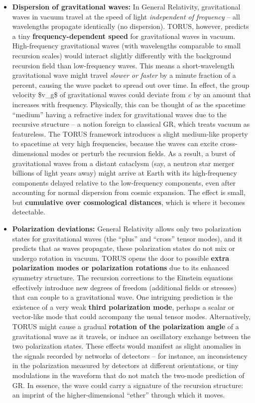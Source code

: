 \documentclass[]{article}
\begin{document}
\begin{itemize}
\item
  \textbf{Dispersion of gravitational waves:} In General Relativity,
  gravitational waves in vacuum travel at the speed of light
  \emph{independent of frequency} -- all wavelengths propagate
  identically (no dispersion). TORUS, however, predicts a tiny
  \textbf{frequency-dependent speed} for gravitational waves in vacuum​.
  High-frequency gravitational waves (with wavelengths comparable to
  small recursion scales) would interact slightly differently with the
  background recursion field than low-frequency waves. This means a
  short-wavelength gravitational wave might travel \emph{slower or
  faster} by a minute fraction of a percent, causing the wave packet to
  spread out over time. In effect, the group velocity \$v\_g\$ of
  gravitational waves could deviate from \emph{c} by an amount that
  increases with frequency​. Physically, this can be thought of as the
  spacetime ``medium'' having a refractive index for gravitational waves
  due to the recursive structure -- a notion foreign to classical GR,
  which treats vacuum as featureless. The TORUS framework introduces a
  slight medium-like property to spacetime at very high frequencies,
  because the waves can excite cross-dimensional modes or perturb the
  recursion fields. As a result, a burst of gravitational waves from a
  distant cataclysm (say, a neutron star merger billions of light years
  away) might arrive at Earth with its high-frequency components delayed
  relative to the low-frequency components, even after accounting for
  normal dispersion from cosmic expansion. The effect is small, but
  \textbf{cumulative over cosmological distances}, which is where it
  becomes detectable​.
\item
  \textbf{Polarization deviations:} General Relativity allows only two
  polarization states for gravitational waves (the ``plus'' and
  ``cross'' tensor modes), and it predicts that as waves propagate,
  these polarization states do not mix or undergo rotation in vacuum.
  TORUS opens the door to possible \textbf{extra polarization modes or
  polarization rotations} due to its enhanced symmetry structure. The
  recursion corrections to the Einstein equations effectively introduce
  new degrees of freedom (additional fields or stresses) that can couple
  to a gravitational wave. One intriguing prediction is the existence of
  a very weak \textbf{third polarization mode}, perhaps a scalar or
  vector-like mode that could accompany the usual tensor modes​.
  Alternatively, TORUS might cause a gradual \textbf{rotation of the
  polarization angle} of a gravitational wave as it travels, or induce
  an oscillatory exchange between the two polarization states. These
  effects would manifest as slight anomalies in the signals recorded by
  networks of detectors -- for instance, an inconsistency in the
  polarization measured by detectors at different orientations, or tiny
  modulations in the waveform that do not match the two-mode prediction
  of GR. In essence, the wave could carry a signature of the recursion
  structure: an imprint of the higher-dimensional ``ether'' through
  which it moves.
\end{itemize}
\end{document}
